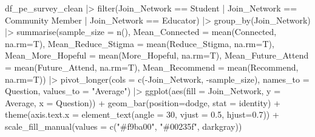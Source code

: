 \documentclass[
  letterpaper,
  DIV=11,
  numbers=noendperiod]{scrartcl}
\newenvironment{Shaded}{\begin{snugshade}}{\end{snugshade}}
\newcommand{\AttributeTok}[1]{\textcolor[rgb]{0.40,0.45,0.13}{#1}}
\newcommand{\DecValTok}[1]{\textcolor[rgb]{0.68,0.00,0.00}{#1}}
\newcommand{\FloatTok}[1]{\textcolor[rgb]{0.68,0.00,0.00}{#1}}
\newcommand{\FunctionTok}[1]{\textcolor[rgb]{0.28,0.35,0.67}{#1}}
\newcommand{\NormalTok}[1]{\textcolor[rgb]{0.00,0.23,0.31}{#1}}
\newcommand{\SpecialCharTok}[1]{\textcolor[rgb]{0.37,0.37,0.37}{#1}}
\newcommand{\StringTok}[1]{\textcolor[rgb]{0.13,0.47,0.30}{#1}}
\begin{document}
\begin{Shaded}
\begin{Highlighting}[]
\NormalTok{df\_pe\_survey\_clean }\SpecialCharTok{|\textgreater{}} 
  \FunctionTok{filter}\NormalTok{(Join\_Network }\SpecialCharTok{==} \StringTok{\textquotesingle{}Student\textquotesingle{}} \SpecialCharTok{|}
\NormalTok{           Join\_Network }\SpecialCharTok{==} \StringTok{\textquotesingle{}Community Member\textquotesingle{}} \SpecialCharTok{|}
\NormalTok{           Join\_Network }\SpecialCharTok{==} \StringTok{\textquotesingle{}Educator\textquotesingle{}}\NormalTok{) }\SpecialCharTok{|\textgreater{}} 
  \FunctionTok{group\_by}\NormalTok{(Join\_Network) }\SpecialCharTok{|\textgreater{}} 
  \FunctionTok{summarise}\NormalTok{(}\AttributeTok{sample\_size =} \FunctionTok{n}\NormalTok{(),}
            \AttributeTok{Mean\_Connected =} \FunctionTok{mean}\NormalTok{(Connected, }\AttributeTok{na.rm=}\NormalTok{T),}
            \AttributeTok{Mean\_Reduce\_Stigma =} \FunctionTok{mean}\NormalTok{(Reduce\_Stigma, }\AttributeTok{na.rm=}\NormalTok{T),}
            \AttributeTok{Mean\_More\_Hopeful =} \FunctionTok{mean}\NormalTok{(More\_Hopeful, }\AttributeTok{na.rm=}\NormalTok{T),}
            \AttributeTok{Mean\_Future\_Attend =} \FunctionTok{mean}\NormalTok{(Future\_Attend, }\AttributeTok{na.rm=}\NormalTok{T),}
            \AttributeTok{Mean\_Recommend =} \FunctionTok{mean}\NormalTok{(Recommend, }\AttributeTok{na.rm=}\NormalTok{T)) }\SpecialCharTok{|\textgreater{}} 
  \FunctionTok{pivot\_longer}\NormalTok{(}\AttributeTok{cols =} \FunctionTok{c}\NormalTok{(}\SpecialCharTok{{-}}\NormalTok{Join\_Network, }\SpecialCharTok{{-}}\NormalTok{sample\_size),}
               \AttributeTok{names\_to =} \StringTok{\textquotesingle{}Question\textquotesingle{}}\NormalTok{,}
               \AttributeTok{values\_to =} \StringTok{"Average"}\NormalTok{) }\SpecialCharTok{|\textgreater{}} 
  \FunctionTok{ggplot}\NormalTok{(}\FunctionTok{aes}\NormalTok{(}\AttributeTok{fill =}\NormalTok{ Join\_Network, }\AttributeTok{y =}\NormalTok{ Average, }\AttributeTok{x =}\NormalTok{ Question)) }\SpecialCharTok{+}
  \FunctionTok{geom\_bar}\NormalTok{(}\AttributeTok{position=}\StringTok{\textquotesingle{}dodge\textquotesingle{}}\NormalTok{, }\AttributeTok{stat =} \StringTok{\textquotesingle{}identity\textquotesingle{}}\NormalTok{) }\SpecialCharTok{+}
  \FunctionTok{theme}\NormalTok{(}\AttributeTok{axis.text.x =} \FunctionTok{element\_text}\NormalTok{(}\AttributeTok{angle =} \DecValTok{30}\NormalTok{, }\AttributeTok{vjust =} \FloatTok{0.5}\NormalTok{, }\AttributeTok{hjust=}\FloatTok{0.7}\NormalTok{)) }\SpecialCharTok{+}
  \FunctionTok{scale\_fill\_manual}\NormalTok{(}\AttributeTok{values =} \FunctionTok{c}\NormalTok{(}\StringTok{"\#f9ba00"}\NormalTok{,}
                               \StringTok{"\#00235f"}\NormalTok{,}
                               \StringTok{\textquotesingle{}darkgray\textquotesingle{}}\NormalTok{))}
\end{Highlighting}
\end{Shaded}
\end{document}
